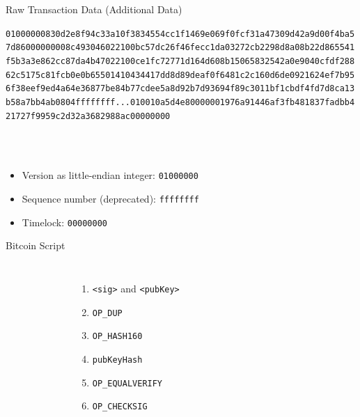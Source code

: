 \documentclass[handout]{beamer}
\begin{document}
\begin{frame}{Raw Transaction Data (Additional Data)}
\begin{scriptsize}
\texttt{\alert<2>{01000000}\textcolor{black!30}{830d2e8f94c33a10f3834554cc1f1469e069f0fcf31a47309d42a9d00f4ba5
7d86000000008c493046022100bc57dc26f46fecc1da03272cb2298d8a08b22d865541
f5b3a3e862cc87da4b47022100ce1fc72771d164d608b15065832542a0e9040cfdf288
62c5175c81fcb0e0b65501410434417dd8d89deaf0f6481c2c160d6de0921624ef7b95
6f38eef9ed4a64e36877be84b77cdee5a8d92b7d93694f89c3011bf1cbdf4fd7d8ca13
b58a7bb4ab0804}\alert<3>{ffffffff}...\textcolor{black!30}{010010a5d4e80000001976a91446af3fb481837fadbb4
21727f9959c2d32a3682988ac}\alert<4>{00000000}}
\end{scriptsize}
\vspace{1em}
\scriptsize \\
\\
\begin{itemize}
	\item \alert<2>{Version as little-endian integer: \texttt{01000000}}
	\item \alert<3>{Sequence number (deprecated): \texttt{ffffffff}}
	\item \alert<4>{Timelock: \texttt{00000000}}
\end{itemize}
\end{frame}


\begin{frame}{Bitcoin Script}
\begin{columns}
\begin{figure}
	
\end{figure}
\begin{enumerate}
\item<1-> \texttt{<sig>} and \texttt{<pubKey>}
\item<2-> \texttt{OP\_DUP}
\item<6-> \texttt{OP\_HASH160}
\item<10-> \texttt{pubKeyHash}
\item<11-> \texttt{OP\_EQUALVERIFY}
\item<14-> \texttt{OP\_CHECKSIG}
\end{enumerate}
\end{columns}
\end{frame}
\end{document}
